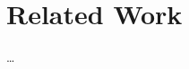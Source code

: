
\chapter{Related Work} %



\ifpdf
    \graphicspath{{6_relatedwork/figures/PNG/}{6_relatedwork/figures/PDF/}{6_relatedwork/figures/}}
\else
    \graphicspath{{6_relatedwork/figures/EPS/}{6_relatedwork/figures/}}
\fi


% 

\dots



